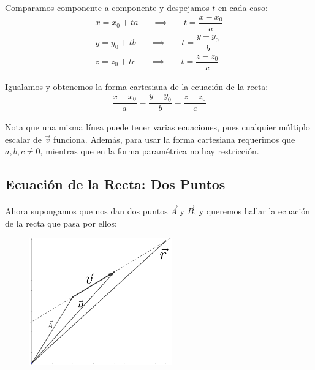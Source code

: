\documentclass[12pt, fleqn]{report}                             %
\DeclareMathOperator \Space     {\quad}                         %
\theoremstyle{break}                                            %
\begin{document}
                Comparamos componente a componente y despejamos $t$ en cada caso:
                \begin{align*}
                    x = x_0 + ta \Space \implies \Space t = \dfrac{x - x_0}{a}  \\
                    y = y_0 + tb \Space \implies \Space t = \dfrac{y - y_0}{b}  \\
                    z = z_0 + tc \Space \implies \Space t = \dfrac{z - z_0}{c}
                \end{align*}
                
                Igualamos y obtenemos la forma cartesiana de la ecuación de la recta:
                \begin{align}
                      \dfrac{x - x_0}{a} 
                    = \dfrac{y - y_0}{b}
                    = \dfrac{z - z_0}{c} \label{lineEquation1}
                \end{align}
                
                Nota que una misma línea puede tener varias ecuaciones, pues cualquier múltiplo
                escalar de $\vec{v}$ funciona. Además, para usar la forma cartesiana requerimos
                que $a, b, c\neq 0$, mientras que en la forma paramétrica no hay restricción.
                


            \subsection{Ecuación de la Recta: Dos Puntos}
            
                Ahora supongamos que nos dan dos puntos $\vec{A}$ y $\vec{B}$, y queremos hallar
                la ecuación de la recta que pasa por ellos:
                
                \begin{figure}[H]
                    \centering
                    \includegraphics[width=0.55\textwidth]{line2}
                \end{figure}
            
\end{document}
